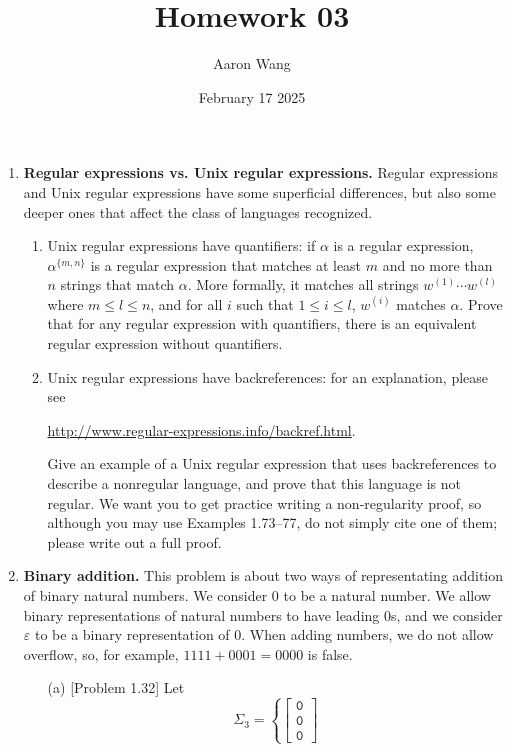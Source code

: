 \documentclass{article}
\title{Homework 03}
\author{Aaron Wang}
\date{February 17 2025}
\newcommand{\e}{\varepsilon}
\newcommand{\str}{\texttt}
\newcommand{\newp}{\\[2mm]}
\begin{document}
\maketitle
\begin{enumerate}
    \item \textbf{Regular expressions vs. Unix regular expressions.} Regular expressions and Unix regular expressions have some superficial differences, but also some deeper ones that affect the class of languages recognized.
    \begin{enumerate}
        \item Unix regular expressions have quantifiers: if $\alpha$ is a regular expression, $\alpha^{\{m,n\}}$ is a regular expression that matches at least $m$ and no more than $n$ strings that match $\alpha$. More formally, it matches all strings $w^{(1)}\cdots w^{(l)}$ where $m \leq l \leq n$, and for all $i$ such that $1 \leq i \leq l$, $w^{(i)}$ matches $\alpha$. Prove that for any regular expression with quantifiers, there is an equivalent regular expression without quantifiers.\newp
        
        \item Unix regular expressions have backreferences: for an explanation, please see 
        \begin{center}
            \url{http://www.regular-expressions.info/backref.html}.
        \end{center} Give an example of a Unix regular expression that uses backreferences to describe a nonregular language, and prove that this language is not regular. We want you to get practice writing a non-regularity proof, so although you may use Examples 1.73–77, do not simply cite one of them; please write out a full proof. \newp
        
    \end{enumerate}
\newpage
    \item \textbf{Binary addition.} This problem is about two ways of representating addition of binary natural numbers. We consider 0 to be a natural number. We allow binary representations of natural numbers to have leading 0s, and we consider $\e$ to be a binary representation of 0. When adding numbers, we do not allow overflow, so, for example, $1111 + 0001 = 0000$ is false.
    \begin{enumerate}
        \item [(a)] [Problem 1.32] Let
        \[
        \Sigma_3 = \left\{
        \begin{bmatrix}
        \str{0} \\ \str{0} \\ \str{0}

\end{bmatrix}\]
\end{enumerate}
\end{enumerate}
\end{document}
